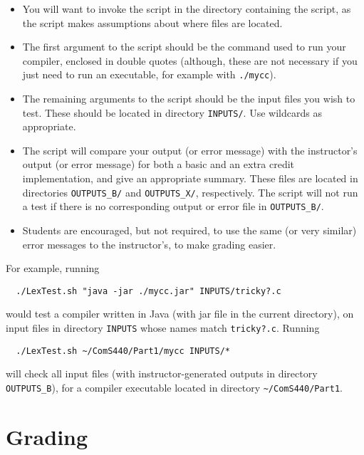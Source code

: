 \documentclass{article}
\begin{document}
\begin{itemize}
  \item
    You will want to invoke the script in the directory containing the
    script, as the script makes assumptions about where files are located.

  \item
    The first argument to the script should be the command used to run your
    compiler, enclosed in double quotes
    (although, these are not necessary if you just need to run an
    executable, for example with {\tt ./mycc}).

  \item
    The remaining arguments to the script should be the input files
    you wish to test.
    These should be located in directory {\tt INPUTS/}.
    Use wildcards as appropriate.

  \item
    The script will compare your output (or error message)
    with the instructor's output (or error message)
    for both a basic and an extra credit implementation,
    and give an appropriate summary.
    These files are located in directories {\tt OUTPUTS\_B/}
    and {\tt OUTPUTS\_X/}, respectively.
    The script will not run a test if there is no corresponding
    output or error file in {\tt OUTPUTS\_B/}.

  \item
    Students are encouraged, but not required,
    to use the same (or very similar) error messages
    to the instructor's, to make grading easier.

\end{itemize}
For example, running
\begin{verbatim}
  ./LexTest.sh "java -jar ./mycc.jar" INPUTS/tricky?.c
\end{verbatim}
would test a compiler written in Java
(with jar file in the current directory),
on input files in directory {\tt INPUTS} whose names match
{\tt tricky?.c}.
Running
\begin{verbatim}
  ./LexTest.sh ~/ComS440/Part1/mycc INPUTS/*
\end{verbatim}
will check all input files (with instructor-generated outputs in directory
{\tt OUTPUTS\_B}),
for a compiler executable located in directory
\verb|~/ComS440/Part1|.


\section{Grading}
\end{document}
